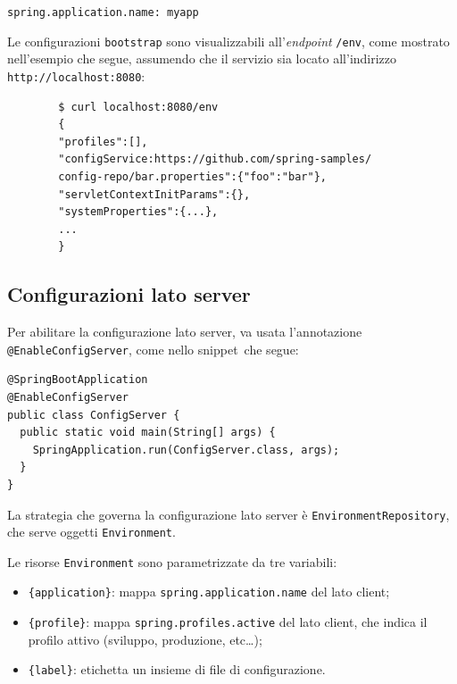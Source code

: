 \begin{tcolorbox}
\texttt{spring.application.name: myapp}
\end{tcolorbox}

Le configurazioni \texttt{bootstrap} sono visualizzabili all'\textit{endpoint} \texttt{/env}, come mostrato nell'esempio che segue, assumendo che il servizio sia locato all'indirizzo \texttt{http://localhost:8080}:

\begin{tcolorbox}
	\begin{verbatim}
		$ curl localhost:8080/env
		{
		"profiles":[],
		"configService:https://github.com/spring-samples/
		config-repo/bar.properties":{"foo":"bar"},
		"servletContextInitParams":{},
		"systemProperties":{...},
		...
		}
	\end{verbatim}
\end{tcolorbox}

\subsection{Configurazioni lato server} Per abilitare la configurazione lato server, va usata l'annotazione \texttt{@EnableConfigServer}, come nello \gls{snippet}\gloss\ che segue:

\begin{tcolorbox}
	\begin{lstlisting}
@SpringBootApplication
@EnableConfigServer
public class ConfigServer {
  public static void main(String[] args) {
    SpringApplication.run(ConfigServer.class, args);
  }
}
	\end{lstlisting}
\end{tcolorbox}

La strategia che governa la configurazione lato server è \texttt{EnvironmentRepository}, che serve oggetti \texttt{Environment}.

Le risorse \texttt{Environment} sono parametrizzate da tre variabili:
\begin{itemize}
	\item \texttt{\{application\}}: mappa \texttt{spring.application.name} del lato client;
	\item \texttt{\{profile\}}: mappa \texttt{spring.profiles.active} del lato client, che indica il profilo attivo (sviluppo, produzione, etc\dots);
	\item \texttt{\{label\}}: etichetta un insieme di file di configurazione.
\end{itemize}

